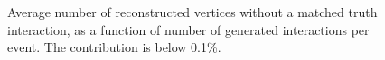 \begin{figure}[h]
	\centering
	\caption{Average number of reconstructed vertices without a matched truth interaction, as a function of number of generated interactions per event. The contribution is below 0.1\%.}
	\label{fig:truefakes}
\end{figure}

